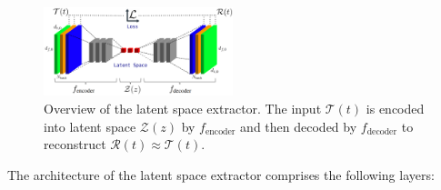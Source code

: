 \begin{figure}
\centering
\includegraphics[width=0.49\textwidth]{img/latent_space_creation.png}
\caption{Overview of the latent space extractor. The input $\mathcal{T}(t)$ is encoded into latent space $\mathcal{Z}(z)$ by $f_{\text{encoder}}$ and then decoded by $f_{\text{decoder}}$ to reconstruct $\mathcal{R}(t) \approx \mathcal{T}(t)$.}
\label{fig:latent_space_creation}
\end{figure}

The architecture of the latent space extractor comprises the following layers:

